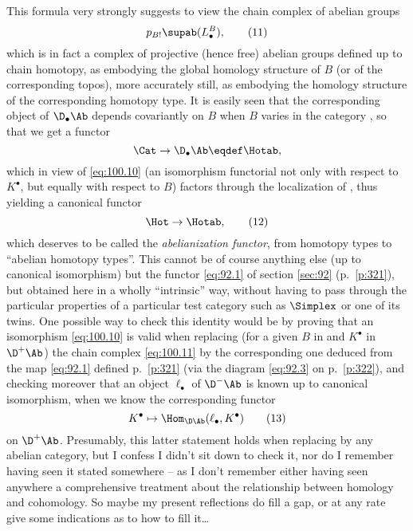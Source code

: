 This formula very strongly suggests to view the chain complex of
abelian groups
\begin{equation}
  \label{eq:100.11}
  p_{B!}\supab(L_\bullet^B),\tag{11}
\end{equation}
which is in fact a complex of projective (hence free) abelian groups
defined up to chain homotopy, as embodying the global homology
structure of $B$ (or of the corresponding topos), more accurately
still, as embodying the homology structure of the corresponding
homotopy type. It is easily seen that the corresponding object of
$\D_\bullet\Ab$ depends covariantly on $B$ when $B$ varies in the
category \Cat, so that we get a functor
\[\Cat\to \D_\bullet\Ab \eqdef \Hotab,\]
which in view of \eqref{eq:100.10} (an isomorphism functorial not only
with respect to $K^\bullet$, but equally with respect to $B$) factors
through the localization \Hot{} of \Cat, thus yielding a canonical
functor
\begin{equation}
  \label{eq:100.12}
  \Hot\to\Hotab,\tag{12}
\end{equation}
which deserves to be called the \emph{abelianization functor}, from
homotopy types to ``abelian homotopy types''. This cannot be of course
anything else (up to canonical isomorphism) but the functor
\eqref{eq:92.1} of section \ref{sec:92} (p.\ \ref{p:321}), but
obtained here in a wholly ``intrinsic'' way, without having to pass
through the particular properties of a particular test category such
as $\Simplex$ or one of its twins. One possible way to check this
identity would be by proving that an isomorphism \eqref{eq:100.10} is
valid when replacing (for a given $B$ in \Cat{} and $K^\bullet$ in
$\D^+\Ab$) the chain complex \eqref{eq:100.11} by the corresponding
one deduced from the map \eqref{eq:92.1} defined p.\ \ref{p:321} (via
the diagram \eqref{eq:92.3} on p.\ \ref{p:322}), and checking moreover
that an object $\ell_\bullet$ of $\D^-\Ab$ is known up to canonical
isomorphism, when we know the corresponding functor
\begin{equation}
  \label{eq:100.13}
  K^\bullet\mapsto \Hom_{\D\Ab}(\ell_\bullet,K^\bullet)\tag{13}
\end{equation}
on $\D^+\Ab$. Presumably, this latter statement holds when replacing
\Ab{} by any abelian category, but I confess I didn't sit down to
check it, nor do I remember having seen it stated somewhere -- as I
don't remember either having seen anywhere a comprehensive treatment
about the relationship between homology and cohomology. So maybe my
present reflections do fill a gap, or at any rate give some
indications as to how to fill it\ldots

